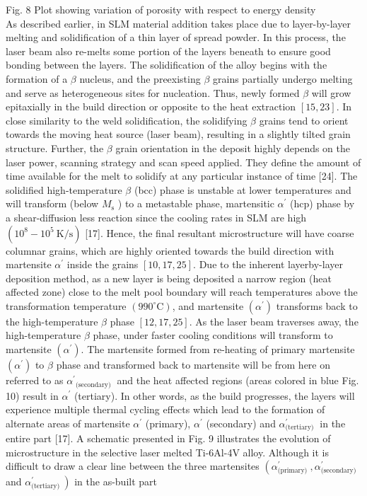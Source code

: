 \documentclass[10pt]{article}
\begin{document}
Fig. 8 Plot showing variation of porosity with respect to energy density\\
As described earlier, in SLM material addition takes place due to layer-by-layer melting and solidification of a thin layer of spread powder. In this process, the laser beam also re-melts some portion of the layers beneath to ensure good bonding between the layers. The solidification of the alloy begins with the formation of a $\beta$ nucleus, and the preexisting $\beta$ grains partially undergo melting and serve as heterogeneous sites for nucleation. Thus, newly formed $\beta$ will grow epitaxially in the build direction or opposite to the heat extraction $[15,23]$. In close similarity to the weld solidification, the solidifying $\beta$ grains tend to orient towards the moving heat source (laser beam), resulting in a slightly tilted grain structure. Further, the $\beta$ grain orientation in the deposit highly depends on the laser power, scanning strategy and scan speed applied. They define the amount of time available for the melt to solidify at any particular instance of time [24]. The solidified high-temperature $\beta$ (bcc) phase is unstable at lower temperatures and will transform (below $M_{\mathrm{s}}$ ) to a metastable phase, martensitic $\alpha^{\prime}$ (hcp) phase by a shear-diffusion less reaction since the cooling rates in SLM are high $\left(10^{8}-10^{5} \mathrm{~K} / \mathrm{s}\right)$ [17]. Hence, the final resultant microstructure will have coarse columnar grains, which are highly oriented towards the build direction with martensite $\alpha^{\prime}$ inside the grains $[10,17,25]$. Due to the inherent layerby-layer deposition method, as a new layer is being deposited a narrow region (heat affected zone) close to the melt pool boundary will reach temperatures above the transformation temperature $\left(990^{\circ} \mathrm{C}\right)$, and martensite $\left(\alpha^{\prime}\right)$ transforms back to the high-temperature $\beta$ phase $[12,17,25]$. As the laser beam traverses away, the high-temperature $\beta$ phase, under faster cooling conditions will transform to martensite $\left(\alpha^{\prime}\right)$. The martensite formed from re-heating of primary martensite $\left(\alpha^{\prime}\right)$ to $\beta$ phase and transformed back to martensite will be from here on referred to as $\alpha^{\prime}{ }_{\text {(secondary) }}$ and the heat affected regions (areas colored in blue Fig. 10) result in $\alpha^{\prime}$ (tertiary). In other words, as the build progresses, the layers will experience multiple thermal cycling effects which lead to the formation of alternate areas of martensite $\alpha^{\prime}$ (primary), $\alpha^{\prime}$ (secondary) and $\alpha_{\text {(tertiary) }}^{\prime}$ in the entire part [17]. A schematic presented in Fig. 9 illustrates the evolution of microstructure in the selective laser melted Ti-6Al-4V alloy. Although it is difficult to draw a clear line between the three martensites $\left(\alpha_{\text {(primary) }}^{\prime}, \alpha_{\text {(secondary) }}^{\prime}\right.$ and $\left.\alpha_{\text {(tertiary) }}^{\prime}\right)$ in the as-built part
\end{document}
